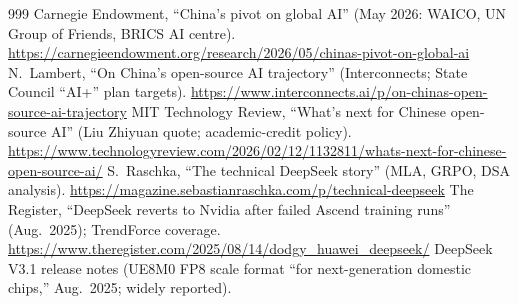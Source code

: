 \begin{thebibliography}{999}
 Carnegie Endowment, ``China's pivot on global AI'' (May 2026: WAICO, UN Group of Friends, BRICS AI centre). \url{https://carnegieendowment.org/research/2026/05/chinas-pivot-on-global-ai}
 N.~Lambert, ``On China's open-source AI trajectory'' (Interconnects; State Council ``AI+'' plan targets). \url{https://www.interconnects.ai/p/on-chinas-open-source-ai-trajectory}
 MIT Technology Review, ``What's next for Chinese open-source AI'' (Liu Zhiyuan quote; academic-credit policy). \url{https://www.technologyreview.com/2026/02/12/1132811/whats-next-for-chinese-open-source-ai/}
 S.~Raschka, ``The technical DeepSeek story'' (MLA, GRPO, DSA analysis). \url{https://magazine.sebastianraschka.com/p/technical-deepseek}
 The Register, ``DeepSeek reverts to Nvidia after failed Ascend training runs'' (Aug.\ 2025); TrendForce coverage. \url{https://www.theregister.com/2025/08/14/dodgy_huawei_deepseek/}
 DeepSeek V3.1 release notes (UE8M0 FP8 scale format ``for next-generation domestic chips,'' Aug.\ 2025; widely reported).


\end{thebibliography}
